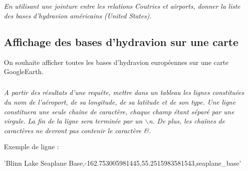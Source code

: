 \documentclass[10pt]{article}
\newif\ifprof
\begin{document}
\subparagraph{}
\textit{En utilisant une jointure entre les relations Coutries et airports, donner la liste des bases d'hydravion américains (United States). }

\ifprof
\begin{corrige}
\begin{envsql}
\begin{sql}
SELECT name FROM 
	(SELECT name,iso_country FROM airports WHERE type='seaplane_base') as aeroports
	JOIN
	(SELECT Countries.code FROM Countries WHERE name=''United States'') as pays 
	ON pays.code = aeroports.iso_country
\end{sql}
\end{envsql}
$$
\pi_{\text{name}}\left(
	\pi_{\text{name,iso\_country}} \left(
		\sigma_{\text{type=''seaplane\_base''}}\left( \text{airports}\right)\right)
	\underset{\text{airports.iso\_country}=\text{Countries.code}}{\bowtie }		
	\pi_{\text{code}} \left(
		\sigma_{\text{name=''United States''}}\left( \text{Countries}\right)\right)\right)
$$
\end{corrige}\else
\fi

\subsection*{Affichage des bases d'hydravion sur une carte}
On souhaite afficher toutes les bases d'hydravion européennes sur une carte GoogleEarth. 


\subparagraph{}
\textit{A partir des résultats d'une requête, mettre dans un tableau les lignes constituées du nom de l'aéroport, de sa longitude, de sa latitude et de son type. Une ligne constituera une seule chaîne de caractère, chaque champ étant séparé par une virgule. La fin de la ligne sera terminée par un $\backslash$n. De plus, les chaînes de caractères ne devront pas contenir le caractère \&.}

\ifprof
\begin{corrige}
\end{corrige}
\else
\fi

\begin{exemple}
Exemple de ligne : 
\begin{python}
'Blinn Lake Seaplane Base,-162.753005981445,55.2515983581543,seaplane_base\n'
\end{python}
\end{exemple}
\end{document}
